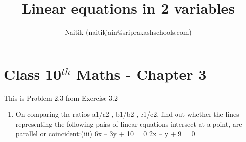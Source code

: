 \documentclass[10pt]{article}
\title{Linear equations in 2 variables}
\author{Naitik (naitikjain@sriprakashschools.com)}
\begin{document}
\maketitle
\section*{Class 10$^{th}$ Maths - Chapter 3}
This is Problem-2.3 from Exercise 3.2
\begin{enumerate}
\item On comparing the ratios a1/a2 , b1/b2 , c1/c2, find out whether the lines representing the following pairs of linear equations intersect at a point, are parallel or coincident:(iii) 6x – 3y + 10 = 0
2x – y + 9 = 0\\

\end{enumerate}
\end{document}
